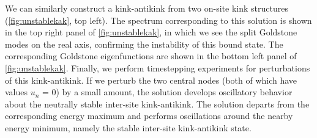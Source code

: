 \documentclass[12pt,reqno]{amsart}
\begin{document}



We can similarly construct a kink-antikink from two on-site kink structures (\cref{fig:unstablekak}, top left). The spectrum corresponding to this solution is shown in the top right panel of \cref{fig:unstablekak}, in which we see the split Goldstone modes on the real axis, confirming the instability of
this bound state. The corresponding Goldstone eigenfunctions are shown in the bottom left panel of \cref{fig:unstablekak}. Finally, we perform timestepping experiments for perturbations of this kink-antikink. If we perturb the two central nodes (both of which have values $u_n$ = 0) by a small amount, the solution develops oscillatory behavior about the neutrally stable inter-site kink-antikink. The solution departs from the corresponding energy
maximum and performs oscillations around the nearby
energy minimum, namely the stable inter-site kink-antikink
state.
\end{document}
